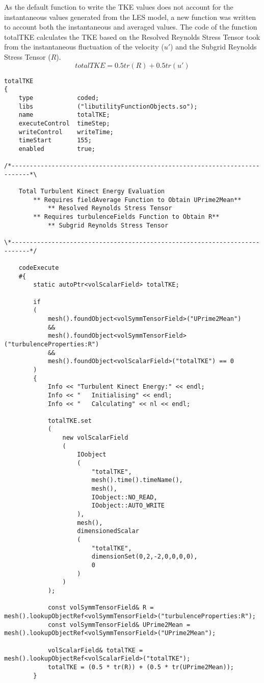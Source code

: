 \noindent As the default function to write the TKE values does not account for the instantaneous values generated from the LES model, a new function was written to account both the instantaneous and averaged values. The code of the function totalTKE calculates the TKE based on the Resolved Reynolds Stress Tensor took from the instantaneous fluctuation of the velocity ($u'$) and the Subgrid Reynolds Stress Tensor ($R$).
\begin{equation}
totalTKE= 0.5tr(R) + 0.5tr(u')
\end{equation}
\begin{lstlisting}
totalTKE
{
	type			coded;
	libs			("libutilityFunctionObjects.so");
	name			totalTKE;
	executeControl	timeStep;
	writeControl	writeTime;
	timeStart		155;
	enabled			true;

/*---------------------------------------------------------------------------*\

	Total Turbulent Kinect Energy Evaluation
		** Requires fieldAverage Function to Obtain UPrime2Mean**
			** Resolved Reynolds Stress Tensor
		** Requires turbulenceFields Function to Obtain R**
			** Subgrid Reynolds Stress Tensor

\*---------------------------------------------------------------------------*/

	codeExecute
	#{
		static autoPtr<volScalarField> totalTKE;

		if
		(
			mesh().foundObject<volSymmTensorField>("UPrime2Mean")
			&&
			mesh().foundObject<volSymmTensorField>("turbulenceProperties:R")
			&&
			mesh().foundObject<volScalarField>("totalTKE") == 0
		)
		{
			Info << "Turbulent Kinect Energy:" << endl;
			Info << "	Initialising" << endl;
			Info << "	Calculating" << nl << endl;

			totalTKE.set
			(
				new volScalarField
				(
					IOobject
					(
						"totalTKE",
						mesh().time().timeName(),
						mesh(),
						IOobject::NO_READ,
						IOobject::AUTO_WRITE
					),
					mesh(),
					dimensionedScalar
					(
						"totalTKE",
						dimensionSet(0,2,-2,0,0,0,0),
						0
					)
				)
			);

			const volSymmTensorField& R = mesh().lookupObjectRef<volSymmTensorField>("turbulenceProperties:R");
			const volSymmTensorField& UPrime2Mean = mesh().lookupObjectRef<volSymmTensorField>("UPrime2Mean");

			volScalarField& totalTKE = mesh().lookupObjectRef<volScalarField>("totalTKE");
			totalTKE = (0.5 * tr(R)) + (0.5 * tr(UPrime2Mean));
		}


\end{lstlisting}

